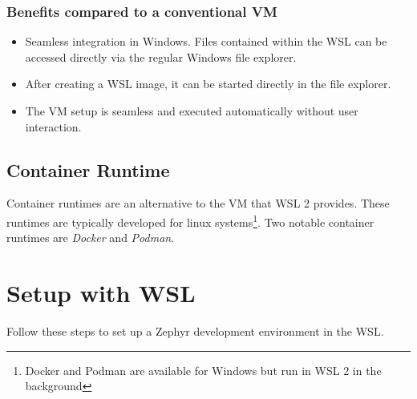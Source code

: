\subsubsection*{Benefits compared to a conventional VM}

\begin{itemize}
  \item Seamless integration in Windows.
        Files contained within the WSL can be accessed directly via the regular Windows file explorer.
  \item After creating a WSL image, it can be started directly in the file explorer.
  \item The VM setup is seamless and executed automatically without user
        interaction.
\end{itemize}

\subsection{Container Runtime}
Container runtimes are an alternative to the VM that WSL 2 provides.
These runtimes are typically developed for linux systems\footnote{Docker and Podman are available for Windows but run in WSL 2 in the background}.
Two notable container runtimes are \emph{Docker} and \emph{Podman}.

\newpage

\section{Setup with WSL}

Follow these steps to set up a Zephyr development environment in the WSL.


